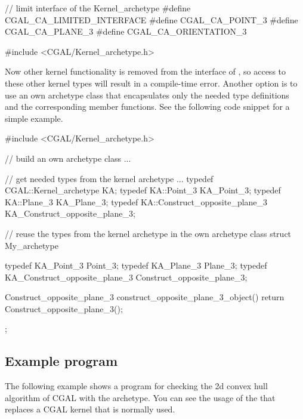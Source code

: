 \ccHtmlLinksOff

\begin{ccExampleCode}
// limit interface of the Kernel_archetype
#define CGAL_CA_LIMITED_INTERFACE
#define CGAL_CA_POINT_3
#define CGAL_CA_PLANE_3
#define CGAL_CA_ORIENTATION_3

#include <CGAL/Kernel_archetype.h>
\end{ccExampleCode}

\ccHtmlLinksOn

Now other kernel functionality is removed from the interface of
, so access to these other kernel types will result
in a compile-time error.
Another option is to use an own archetype class that encapsulates only the 
needed type definitions and the corresponding member functions. 
See the following code snippet for a simple example.

\ccHtmlLinksOff

\begin{ccExampleCode}
#include <CGAL/Kernel_archetype.h>

// build an own archetype class ...

// get needed types from the kernel archetype ...
typedef CGAL::Kernel_archetype           KA;
typedef KA::Point_3                      KA_Point_3;
typedef KA::Plane_3                      KA_Plane_3;
typedef KA::Construct_opposite_plane_3   KA_Construct_opposite_plane_3;

// reuse the types from the kernel archetype in the own archetype class
struct My_archetype {
  typedef KA_Point_3                    Point_3;
  typedef KA_Plane_3                    Plane_3;
  typedef KA_Construct_opposite_plane_3 Construct_opposite_plane_3;
  
  Construct_opposite_plane_3
  construct_opposite_plane_3_object()
  { return Construct_opposite_plane_3(); }
};
\end{ccExampleCode}

\ccHtmlLinksOn

\subsection{Example program}

The following example shows a program for checking the 2d convex hull algorithm
of CGAL with the archetype. You can see the usage of the
 that replaces a CGAL kernel that is normally used.

\ccHtmlLinksOff

